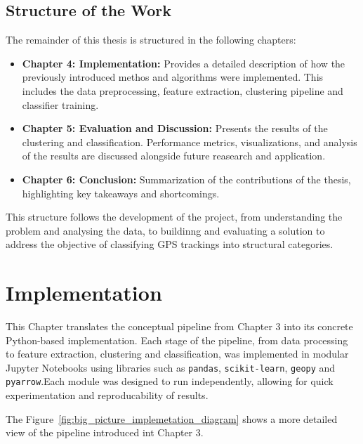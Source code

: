 \documentclass[a4paper,12pt,twoside]{scrreprt}
\begin{document}
\section{Structure of the Work}

The remainder of this thesis is structured in the following chapters:

\begin{itemize}
  \item \textbf{Chapter 4: Implementation:} Provides a detailed description of
        how the previously introduced methos and algorithms were implemented.
        This
        includes the data preprocessing, feature extraction, clustering
        pipeline and
        classifier training.
  \item \textbf{Chapter 5: Evaluation and Discussion:} Presents the results of
        the clustering and classification. Performance metrics, visualizations,
        and
        analysis of the results are discussed alongside future reasearch and
        application.
  \item \textbf{Chapter 6: Conclusion:} Summarization of the contributions of
        the thesis, highlighting key takeaways and shortcomings.
\end{itemize}

This structure follows the development of the project, from understanding the
problem and analysing the data, to buildinng and evaluating a solution to
address the objective of classifying GPS trackings into structural categories.
\chapter{Implementation}

This Chapter translates the conceptual pipeline from Chapter 3 into its
concrete Python-based implementation.
Each stage of the pipeline, from data processing to feature extraction,
clustering and classification, was implemented in modular Jupyter Notebooks
using libraries such as \texttt{pandas}, \texttt{scikit-learn}, \texttt{geopy}
and \texttt{pyarrow}.Each module was designed to run independently, allowing
for quick
experimentation and reproducability of results.


The
Figure~\ref{fig:big_picture_implemetation_diagram} shows a more detailed view
of the pipeline introduced int Chapter 3.
\end{document}
